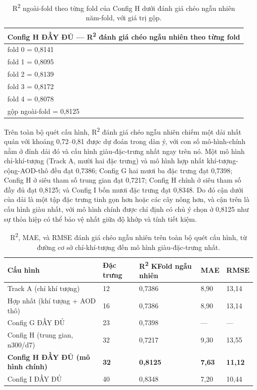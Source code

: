 {\small
\begin{longtable}{l}
\caption{R\textsuperscript{2} ngoài-fold theo từng fold của Config H dưới đánh giá chéo ngẫu nhiên năm-fold, với giá trị gộp.}\\
\toprule
\textbf{Config H ĐẦY ĐỦ --- R\textsuperscript{2} đánh giá chéo ngẫu nhiên theo từng fold} \\
\midrule\endhead
fold 0 = 0,8141 \\
fold 1 = 0,8095 \\
fold 2 = 0,8139 \\
fold 3 = 0,8172 \\
fold 4 = 0,8078 \\
gộp ngoài-fold = 0,8125 \\
\bottomrule
\end{longtable}
}


Trên toàn bộ quét cấu hình, R\textsuperscript{2} đánh giá chéo ngẫu nhiên chiếm một dải nhất quán với khoảng 0,72--0,81 được dự đoán trong dàn ý, với con số mô-hình-chính nằm ở đỉnh dải đó và cấu hình giàu-đặc-trưng nhất ngay trên nó. Một mô hình chỉ-khí-tượng (Track A, mười hai đặc trưng) và mô hình hợp nhất khí-tượng-cộng-AOD-thô đều đạt 0,7386; Config G hai mươi ba đặc trưng đạt 0,7398; Config H ở siêu tham số trung gian đạt 0,7217; Config H chính ở siêu tham số đầy đủ đạt 0,8125; và Config I bốn mươi đặc trưng đạt 0,8348. Do đó cận dưới của dải là một tập đặc trưng tinh gọn hơn hoặc các cây nông hơn, và cận trên là cấu hình giàu nhất, với mô hình chính được chỉ định có chủ ý chọn ở 0,8125 như sự thỏa hiệp có thể bảo vệ nhất giữa độ khớp và tính tiết kiệm.

{\small
\begin{longtable}{lllll}
\caption{R\textsuperscript{2}, MAE, và RMSE đánh giá chéo ngẫu nhiên trên toàn bộ quét cấu hình, từ đường cơ sở chỉ-khí-tượng đến mô hình giàu-đặc-trưng nhất.}\\
\toprule
\textbf{Cấu hình} & \textbf{Đặc trưng} & \textbf{R\textsuperscript{2} KFold ngẫu nhiên} & \textbf{MAE} & \textbf{RMSE} \\
\midrule\endhead
Track A (chỉ khí tượng) & 12 & 0,7386 & 8,90 & 13,14 \\
Hợp nhất (khí tượng + AOD thô) & 16 & 0,7386 & 8,90 & 13,14 \\
Config G ĐẦY ĐỦ & 23 & 0,7398 & --- & --- \\
Config H (trung gian, n300/d7) & 32 & 0,7217 & 9,30 & 13,55 \\
\textbf{Config H ĐẦY ĐỦ (mô hình chính)} & \textbf{32} & \textbf{0,8125} & \textbf{7,63} & \textbf{11,12} \\
Config I ĐẦY ĐỦ & 40 & 0,8348 & 7,20 & 10,44 \\
\bottomrule
\end{longtable}
}



